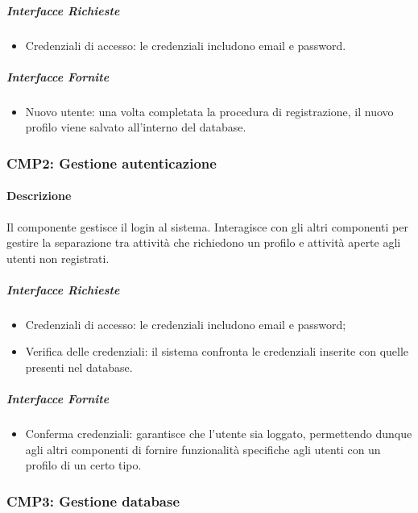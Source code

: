\documentclass[9pt]{extarticle}
\begin{document}
\subparagraph{Interfacce Richieste}
\begin{itemize}
	\item Credenziali di accesso: le credenziali includono email e password.
\end{itemize}

\subparagraph{Interfacce Fornite}
\begin{itemize}
	\item Nuovo utente: una volta completata la procedura di registrazione, il nuovo profilo viene salvato all'interno del database.
\end{itemize}


\subsubsection*{CMP2: Gestione autenticazione}
\paragraph{Descrizione}
Il componente gestisce il login al sistema. Interagisce con gli altri componenti per gestire la separazione tra attività che richiedono un profilo e attività aperte agli utenti non registrati.
\subparagraph{Interfacce Richieste}
\begin{itemize}
	\item Credenziali di accesso: le credenziali includono email e password;
	\item Verifica delle credenziali: il sistema confronta le credenziali inserite con quelle presenti nel database.
\end{itemize}

\subparagraph{Interfacce Fornite}
\begin{itemize}
	\item Conferma credenziali: garantisce che l'utente sia loggato, permettendo dunque agli altri componenti di fornire funzionalità specifiche agli utenti con un profilo di un certo tipo.
\end{itemize}

\subsubsection*{CMP3: Gestione database}
\end{document}
